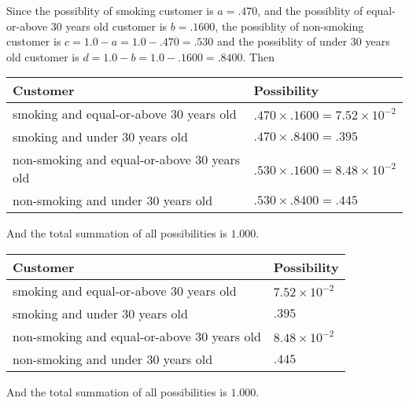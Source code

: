 \documentclass[12pt]{article}
\begin{document}
  
 
 
\noindent{}

Since the possiblity of  %
smoking customer is $ a =  %
.470 $,
and the possiblity of  %
equal-or-above 30 years old customer is $ b =  %
.1600 $,
the possiblity of  %
non-smoking customer is $ c = 1.0 - a = 1.0 -
.470
=  %
.530 $ and the possiblity of  %
under 30 years old
customer is $ d = 1.0 - b = 1.0 -  %
.1600 =  %
.8400  $.
Then
 
\noindent
\begin{tabular}{|l|l|}
\hline
Customer & Possibility \\
\hline
smoking  and  %
equal-or-above 30 years old  &
  $ %
.470 \times  %
.1600 =  %
7.52 \times 10^{-2}$ \\
\hline
smoking  and  %
under 30 years old &
  $ %
.470 \times  %
.8400 =  %
.395$ \\
\hline
 non-smoking and  %
equal-or-above 30 years old  &
  $ %
.530 \times  %
.1600 =  %
8.48 \times 10^{-2}$ \\
\hline
 non-smoking and  %
under 30 years old &
  $ %
.530 \times  %
.8400 =  %
.445$ \\
\hline
\end{tabular}
 
\noindent
And the total summation of all possibilities is $  %
1.000 $.
 
 
 
 
 
 
\noindent{}

 
\noindent
\begin{tabular}{|l|l|}
\hline
Customer & Possibility \\
\hline
smoking  and  %
equal-or-above 30 years old &
  $ %
7.52 \times 10^{-2}$ \\
\hline
smoking  and  %
under 30 years old &
  $ %
.395$ \\
\hline
 non-smoking and  %
equal-or-above 30 years old &
  $ %
8.48 \times 10^{-2}$ \\
\hline
 non-smoking and  %
under 30 years old &
  $ %
.445$ \\
\hline
\end{tabular}
 
\noindent
 And the total summation of all possibilities is $  %
1.000 $.
 
 
 
\end{document}
